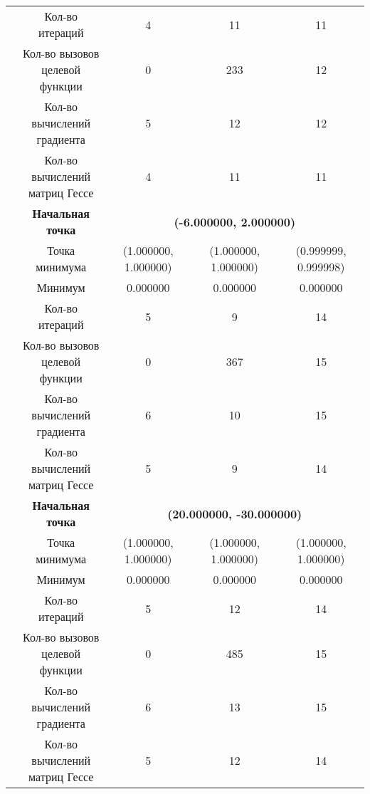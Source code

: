 \begin{table}[H]
\begin{tabular}{|c|c|c|c|c|}
	\cline{2-5}
	&Кол-во итераций &4 &11 &11 \\ 
	\cline{2-5}
	&\makecell{Кол-во вызовов\\целевой функции} &0 &233 &12 \\ 
	\cline{2-5}
	&\makecell{Кол-во вычислений\\градиента} &5 &12 &12 \\ 
	\cline{2-5}
	&\makecell{Кол-во вычислений\\матриц Гессе} &4 &11 &11 \\ 
	\cline{2-5}
	\hline
	\multirow{12}{*}{\rotatebox[origin=c]{90}{$\varepsilon = 1e-06$}}&\textbf{Начальная точка} &\multicolumn{3}{c|}{\textbf{(-6.000000, 2.000000)}}\\
	\cline{2-5}
	&Точка минимума &(1.000000, 1.000000) &(1.000000, 1.000000) &(0.999999, 0.999998) \\ 
	\cline{2-5}
	&Минимум &0.000000 &0.000000 &0.000000 \\ 
	\cline{2-5}
	&Кол-во итераций &5 &9 &14 \\ 
	\cline{2-5}
	&\makecell{Кол-во вызовов\\целевой функции} &0 &367 &15 \\ 
	\cline{2-5}
	&\makecell{Кол-во вычислений\\градиента} &6 &10 &15 \\ 
	\cline{2-5}
	&\makecell{Кол-во вычислений\\матриц Гессе} &5 &9 &14 \\ 
	\cline{2-5}
\cline{2-5}&\textbf{Начальная точка} &\multicolumn{3}{c|}{\textbf{(20.000000, -30.000000)}}\\
	\cline{2-5}
	&Точка минимума &(1.000000, 1.000000) &(1.000000, 1.000000) &(1.000000, 1.000000) \\ 
	\cline{2-5}
	&Минимум &0.000000 &0.000000 &0.000000 \\ 
	\cline{2-5}
	&Кол-во итераций &5 &12 &14 \\ 
	\cline{2-5}
	&\makecell{Кол-во вызовов\\целевой функции} &0 &485 &15 \\ 
	\cline{2-5}
	&\makecell{Кол-во вычислений\\градиента} &6 &13 &15 \\ 
	\cline{2-5}
	&\makecell{Кол-во вычислений\\матриц Гессе} &5 &12 &14 \\ 
	\cline{2-5}
	\hline

\end{tabular}
\end{table}



